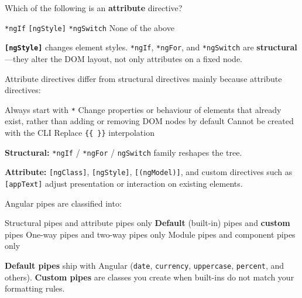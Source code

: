 \question[4]
Which of the following is an \textbf{attribute} directive?
\begin{choices}
  \choice \lstinline[style=htmlinline]|*ngIf|
  \CorrectChoice \lstinline[style=htmlinline]|[ngStyle]|
  \choice \lstinline[style=htmlinline]|*ngSwitch|
  \choice None of the above
\end{choices}
\begin{solution}
  \textbf{\lstinline[style=htmlinline]|[ngStyle]|} changes element styles. \lstinline[style=htmlinline]|*ngIf|, \lstinline[style=htmlinline]|*ngFor|, and \lstinline[style=htmlinline]|*ngSwitch| are \textbf{structural}---they alter the DOM layout, not only attributes on a fixed node.
\end{solution}

\question[4]
Attribute directives differ from structural directives mainly because attribute directives:
\begin{choices}
  \choice Always start with \texttt{*}
  \CorrectChoice Change properties or behaviour of elements that already exist, rather than adding or removing DOM nodes by default
  \choice Cannot be created with the CLI
  \choice Replace \lstinline[style=htmlinline]|{{ }}| interpolation
\end{choices}
\begin{solution}
  \textbf{Structural:} \lstinline[style=htmlinline]|*ngIf| / \lstinline[style=htmlinline]|*ngFor| / \lstinline[style=htmlinline]|ngSwitch| family reshapes the tree.

  \textbf{Attribute:} \lstinline[style=htmlinline]|[ngClass]|, \lstinline[style=htmlinline]|[ngStyle]|, \lstinline[style=htmlinline]|[(ngModel)]|, and custom directives such as \lstinline[style=htmlinline]|[appText]| adjust presentation or interaction on existing elements.
\end{solution}

\question[4]
Angular pipes are classified into:
\begin{choices}
  \choice Structural pipes and attribute pipes only
  \CorrectChoice \textbf{Default} (built-in) pipes and \textbf{custom} pipes
  \choice One-way pipes and two-way pipes only
  \choice Module pipes and component pipes only
\end{choices}
\begin{solution}
  \textbf{Default pipes} ship with Angular (\lstinline[style=htmlinline]|date|, \lstinline[style=htmlinline]|currency|, \lstinline[style=htmlinline]|uppercase|, \lstinline[style=htmlinline]|percent|, and others). \textbf{Custom pipes} are classes you create when built-ins do not match your formatting rules.
\end{solution}

